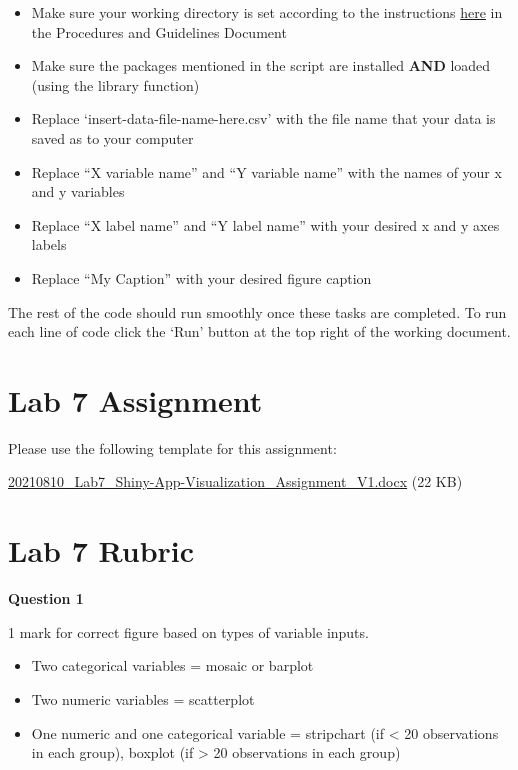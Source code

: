 \documentclass[
]{book}
\providecommand{\tightlist}{%
  \setlength{\itemsep}{0pt}\setlength{\parskip}{0pt}}
\begin{document}
\begin{itemize}
\tightlist
\item
  Make sure your working directory is set according to the instructions \href{https://ubco-biology.github.io/Procedures-and-Guidelines/set-a-working-directory-in-rstudio.html}{here} in the Procedures and Guidelines Document
\item
  Make sure the packages mentioned in the script are installed \textbf{AND} loaded (using the library function)
\item
  Replace `insert-data-file-name-here.csv' with the file name that your data is saved as to your computer
\item
  Replace ``X variable name'' and ``Y variable name'' with the names of your x and y variables
\item
  Replace ``X label name'' and ``Y label name'' with your desired x and y axes labels
\item
  Replace ``My Caption'' with your desired figure caption
\end{itemize}

The rest of the code should run smoothly once these tasks are completed. To run each line of code click the `Run' button at the top right of the working document.

\hypertarget{lab-7-assignment}{%
\chapter*{Lab 7 Assignment}\label{lab-7-assignment}}

Please use the following template for this assignment:

\href{https://osf.io/download/sf2h7}{20210810\_Lab7\_Shiny-App-Visualization\_Assignment\_V1.docx} (22 KB)

\hypertarget{lab-7-rubric}{%
\chapter*{Lab 7 Rubric}\label{lab-7-rubric}}

\textbf{Question 1}

1 mark for correct figure based on types of variable inputs.

\begin{itemize}
\tightlist
\item
  Two categorical variables = mosaic or barplot
\item
  Two numeric variables = scatterplot
\item
  One numeric and one categorical variable = stripchart (if \textless{} 20 observations in each group), boxplot (if \textgreater{} 20 observations in each group)
\end{itemize}
\end{document}
